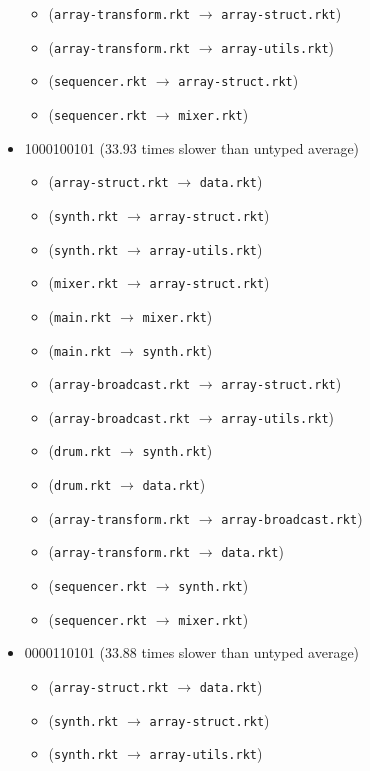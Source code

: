 \documentclass{article}
\newcommand{\mono}[1]{\texttt{#1}}
\begin{document}
\begin{itemize}
\begin{itemize}
  \item (\mono{array-transform.rkt} $\rightarrow$ \mono{array-struct.rkt})
  \item (\mono{array-transform.rkt} $\rightarrow$ \mono{array-utils.rkt})
  \item (\mono{sequencer.rkt} $\rightarrow$ \mono{array-struct.rkt})
  \item (\mono{sequencer.rkt} $\rightarrow$ \mono{mixer.rkt})
  \end{itemize}
\item 1000100101 (33.93 times slower than untyped average)
  \begin{itemize}
  \item (\mono{array-struct.rkt} $\rightarrow$ \mono{data.rkt})
  \item (\mono{synth.rkt} $\rightarrow$ \mono{array-struct.rkt})
  \item (\mono{synth.rkt} $\rightarrow$ \mono{array-utils.rkt})
  \item (\mono{mixer.rkt} $\rightarrow$ \mono{array-struct.rkt})
  \item (\mono{main.rkt} $\rightarrow$ \mono{mixer.rkt})
  \item (\mono{main.rkt} $\rightarrow$ \mono{synth.rkt})
  \item (\mono{array-broadcast.rkt} $\rightarrow$ \mono{array-struct.rkt})
  \item (\mono{array-broadcast.rkt} $\rightarrow$ \mono{array-utils.rkt})
  \item (\mono{drum.rkt} $\rightarrow$ \mono{synth.rkt})
  \item (\mono{drum.rkt} $\rightarrow$ \mono{data.rkt})
  \item (\mono{array-transform.rkt} $\rightarrow$ \mono{array-broadcast.rkt})
  \item (\mono{array-transform.rkt} $\rightarrow$ \mono{data.rkt})
  \item (\mono{sequencer.rkt} $\rightarrow$ \mono{synth.rkt})
  \item (\mono{sequencer.rkt} $\rightarrow$ \mono{mixer.rkt})
  \end{itemize}
\item 0000110101 (33.88 times slower than untyped average)
  \begin{itemize}
  \item (\mono{array-struct.rkt} $\rightarrow$ \mono{data.rkt})
  \item (\mono{synth.rkt} $\rightarrow$ \mono{array-struct.rkt})
  \item (\mono{synth.rkt} $\rightarrow$ \mono{array-utils.rkt})

\end{itemize}
\end{itemize}
\end{document}
